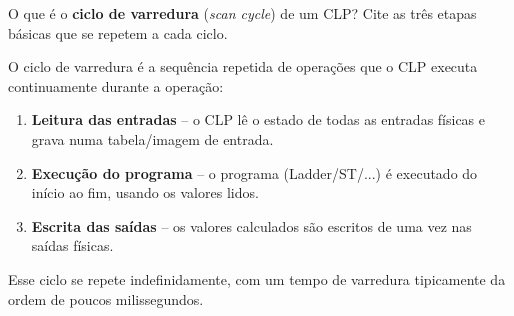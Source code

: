 \question[2] O que é o \textbf{ciclo de varredura} (\textit{scan cycle}) de um CLP? Cite as três etapas básicas que se repetem a cada ciclo.

\begin{solution}
O ciclo de varredura é a sequência repetida de operações que o CLP executa continuamente durante a operação:
\begin{enumerate}
  \item \textbf{Leitura das entradas} -- o CLP lê o estado de todas as entradas físicas e grava numa tabela/imagem de entrada.
  \item \textbf{Execução do programa} -- o programa (Ladder/ST/...) é executado do início ao fim, usando os valores lidos.
  \item \textbf{Escrita das saídas} -- os valores calculados são escritos de uma vez nas saídas físicas.
\end{enumerate}
Esse ciclo se repete indefinidamente, com um tempo de varredura tipicamente da ordem de poucos milissegundos.
\end{solution}

